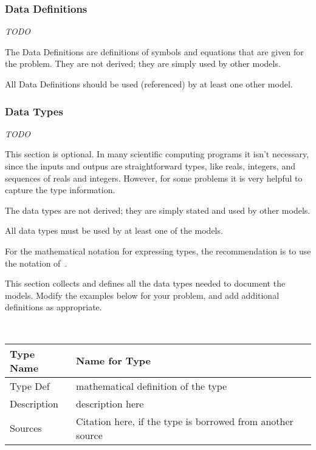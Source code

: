\documentclass[12pt]{article}
\newcommand{\colAwidth}{0.13\textwidth}
\newcommand{\colBwidth}{0.82\textwidth}
\begin{document}
\subsubsection{Data Definitions}\label{sec_datadef}

\emph{TODO}

The Data Definitions are definitions of symbols and equations that are given for
the problem.  They are not derived; they are simply used by other models.

All Data Definitions should be used (referenced) by at least one other model.


\subsubsection{Data Types}\label{sec_datatypes}

\emph{TODO}

This section is optional.  In many scientific computing programs it isn't
necessary, since the inputs and outpus are straightforward types, like reals,
integers, and sequences of reals and integers.  However, for some problems it is
very helpful to capture the type information.

The data types are not derived; they are simply stated and used by other models.

All data types must be used by at least one of the models.

For the mathematical notation for expressing types, the recommendation is to use
the notation of~\citet{HoffmanAndStrooper1995}.

This section collects and defines all the data types needed to document the
models. Modify the examples below for your problem, and add additional
definitions as appropriate.

~\newline

\noindent
\begin{minipage}{\textwidth}
\renewcommand*{\arraystretch}{1.5}
\begin{tabular}{| p{\colAwidth} | p{\colBwidth}|}
  \hline
  \rowcolor[gray]{0.9}
  Type Name & Name for Type\\
  \hline
  Type Def & mathematical definition of the type\\
  \hline
  Description & description here
  \\
  \hline
  Sources & Citation here, if the type is borrowed from another source\\
  \hline
\end{tabular}
\end{minipage}\\
\end{document}
